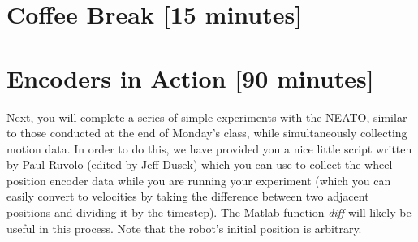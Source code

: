 \documentclass{tufte-handout}
\begin{document}
%
%
%


\vspace{1em}

\section{Coffee Break [15 minutes]}

\section{Encoders in Action [90 minutes]}

Next, you will complete a series of simple experiments with the NEATO, similar to those conducted at the end of Monday's class, while simultaneously collecting motion data. In order to do this, we have provided you a nice little script written by Paul Ruvolo (edited by Jeff Dusek) which you can use to collect the wheel position encoder data while you are running your experiment (which you can easily convert to velocities by taking the difference between two adjacent positions and dividing it by the timestep). The Matlab function \emph{diff} will likely be useful in this process.  Note that the robot's initial position is arbitrary. 
\end{document}
